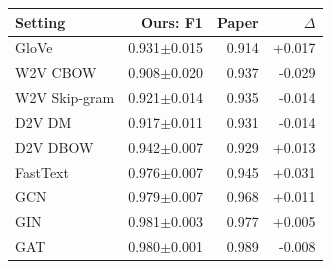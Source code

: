 \begin{tabular}{@{}lrrr@{}}
\toprule
Setting & Ours: F1 & Paper & $\Delta$ \\ \midrule
GloVe & 0.931$\pm$0.015 & 0.914 & +0.017 \\
W2V CBOW & 0.908$\pm$0.020 & 0.937 & -0.029 \\
W2V Skip-gram & 0.921$\pm$0.014 & 0.935 & -0.014 \\
D2V DM & 0.917$\pm$0.011 & 0.931 & -0.014 \\
D2V DBOW & 0.942$\pm$0.007 & 0.929 & +0.013 \\
FastText & 0.976$\pm$0.007 & 0.945 & +0.031 \\
GCN & 0.979$\pm$0.007 & 0.968 & +0.011 \\
GIN & 0.981$\pm$0.003 & 0.977 & +0.005 \\
GAT & 0.980$\pm$0.001 & 0.989 & -0.008 \\
\bottomrule
\end{tabular}
